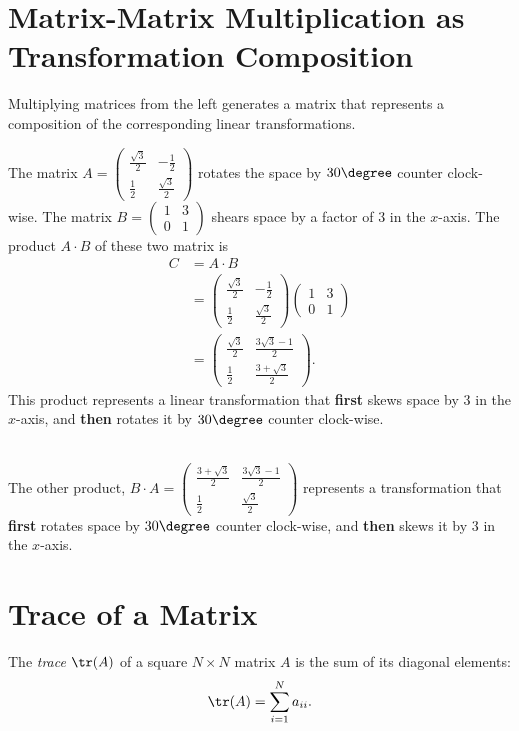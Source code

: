 \section{Matrix-Matrix Multiplication as Transformation Composition}
Multiplying matrices from the left generates a matrix that represents a composition of the corresponding linear transformations.
\begin{example}
  The matrix $A=\begin{pmatrix} \frac{\sqrt{3}}{2} & -\frac{1}{2} \\ \frac{1}{2} & \frac{\sqrt{3}}{2} \end{pmatrix}$ rotates the space by $30\degree$ counter clock-wise. The matrix $B=\begin{pmatrix} 1 & 3 \\ 0 & 1 \end{pmatrix}$ shears space by a factor of $3$ in the $x$-axis.
  The product $A\cdot B$ of these two matrix is
  \begin{align*}
	C &= A\cdot B\\
	&= \begin{pmatrix} \frac{\sqrt{3}}{2} & -\frac{1}{2} \\ \frac{1}{2} & \frac{\sqrt{3}}{2} \end{pmatrix} \begin{pmatrix} 1 & 3 \\ 0 & 1 \end{pmatrix}\\
	&= \begin{pmatrix} \frac{\sqrt{3}}{2} & \frac{3\sqrt{3}-1}{2} \\ \frac{1}{2} & \frac{3+\sqrt{3}}{2} \end{pmatrix}.
  \end{align*}
  This product represents a linear transformation that \textbf{first} skews space by $3$ in the $x$-axis, and \textbf{then} rotates it by $30\degree$ counter clock-wise.

  ~\\
  The other product, $B\cdot A=\begin{pmatrix} \frac{3+\sqrt{3}}{2} & \frac{3\sqrt{3}-1}{2} \\ \frac{1}{2} & \frac{\sqrt{3}}{2} \end{pmatrix}$ represents a transformation that \textbf{first} rotates space by $30\degree$ counter clock-wise, and \textbf{then} skews it by $3$ in the $x$-axis.
\end{example}

\section{Trace of a Matrix}
The \emph{trace} $\tr(A)$ of a square $N\times N$ matrix $A$ is the sum of its diagonal elements:
\begin{equation*}
  \tr(A) = \sum_{i=1}^{N}a_{ii}.
\end{equation*}

